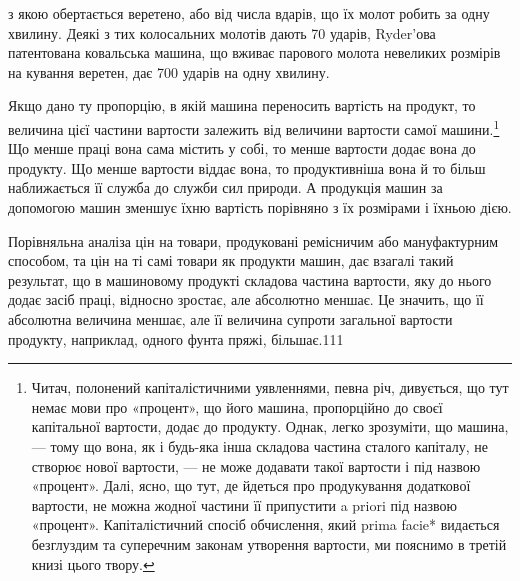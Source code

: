 з якою обертається веретено, або від числа вдарів, що їх молот
робить за одну хвилину. Деякі з тих колосальних молотів дають
70 ударів, Ryder’ова патентована ковальська машина, що вживає
парового молота невеликих розмірів на кування веретен, дає
700 ударів на одну хвилину.

Якщо дано ту пропорцію, в якій машина переносить вартість
на продукт, то величина цієї частини вартости залежить від величини
вартости самої машини.\footnote{
Читач, полонений капіталістичними уявленнями, певна річ, дивується,
що тут немає мови про «процент», що його машина, пропорційно
до своєї капітальної вартости, додає до продукту. Однак, легко зрозуміти,
що машина, — тому що вона, як і будь-яка інша складова частина
сталого капіталу, не створює нової вартости, — не може додавати такої
вартости і під назвою «процент». Далі, ясно, що тут, де йдеться про продукування
додаткової вартости, не можна жодної частини її припустити
a priori під назвою «процент». Капіталістичний спосіб обчислення,
який prima facie* видається безглуздим та суперечним законам утворення
вартости, ми пояснимо в третій книзі цього твору.
} Що менше праці вона сама містить
у собі, то менше вартости додає вона до продукту. Що менше
вартости віддає вона, то продуктивніша вона й то більш наближається
її служба до служби сил природи. А продукція машин за
допомогою машин зменшує їхню вартість порівняно з їх розмірами
і їхньою дією.

Порівняльна аналіза цін на товари, продуковані ремісничим
або мануфактурним способом, та цін на ті самі товари як продукти
машин, дає взагалі такий результат, що в машиновому продукті
складова частина вартости, яку до нього додає засіб праці, відносно
зростає, але абсолютно меншає. Це значить, що її абсолютна
величина меншає, але її величина супроти загальної вартости
продукту, наприклад, одного фунта пряжі, більшає.111

